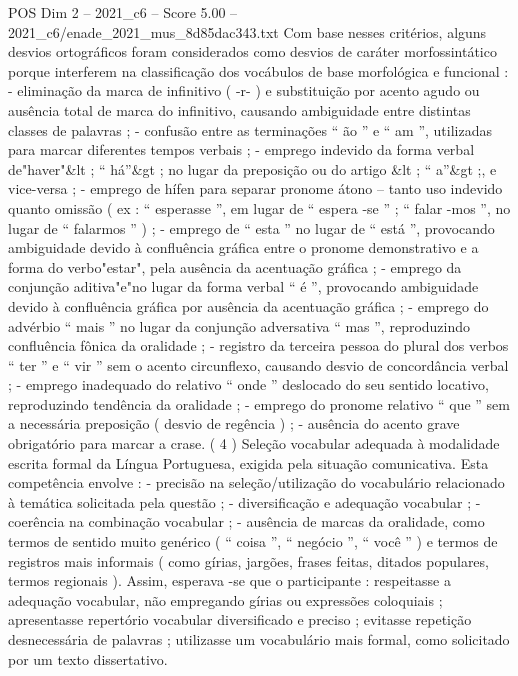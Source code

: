 \begin{textsample}{POS Dim 2 – 2021\_c6 – Score 5.00 – 2021\_c6/enade\_2021\_mus\_8d85dac343.txt}
Com base nesses critérios, alguns desvios ortográficos foram considerados como desvios de caráter morfossintático porque interferem na classificação dos vocábulos de base morfológica e funcional : - eliminação da marca de infinitivo ( -r- ) e substituição por acento agudo ou ausência total de marca do infinitivo, causando ambiguidade entre distintas classes de palavras ; - confusão entre as terminações “ ão ” e “ am ”, utilizadas para marcar diferentes tempos verbais ; - emprego indevido da forma verbal de"haver"\&lt ; “ há”\&gt ; no lugar da preposição ou do artigo \&lt ; “ a”\&gt ;, e vice-versa ; - emprego de hífen para separar pronome átono – tanto uso indevido quanto omissão ( ex : “ esperasse ”, em lugar de “ espera -se ” ; “ falar -mos ”, no lugar de “ falarmos ” ) ; - emprego de “ esta ” no lugar de “ está ”, provocando ambiguidade devido à confluência gráfica entre o pronome demonstrativo e a forma do verbo"estar", pela ausência da acentuação gráfica ; - emprego da conjunção aditiva"e"no lugar da forma verbal “ é ”, provocando ambiguidade devido à confluência gráfica por ausência da acentuação gráfica ; - emprego do advérbio “ mais ” no lugar da conjunção adversativa “ mas ”, reproduzindo confluência fônica da oralidade ; - registro da terceira pessoa do plural dos verbos “ ter ” e “ vir ” sem o acento circunflexo, causando desvio de concordância verbal ; - emprego inadequado do relativo “ onde ” deslocado do seu sentido locativo, reproduzindo tendência da oralidade ; - emprego do pronome relativo “ que ” sem a necessária preposição ( desvio de regência ) ; - ausência do acento grave obrigatório para marcar a crase. ( 4 ) Seleção vocabular adequada à modalidade escrita formal da Língua Portuguesa, exigida pela situação comunicativa.
Esta competência envolve : - precisão na seleção/utilização do vocabulário relacionado à temática solicitada pela questão ; - diversificação e adequação vocabular ; - coerência na combinação vocabular ; - ausência de marcas da oralidade, como termos de sentido muito genérico ( “ coisa ”, “ negócio ”, “ você ” ) e termos de registros mais informais ( como gírias, jargões, frases feitas, ditados populares, termos regionais ).
Assim, esperava -se que o participante : respeitasse a adequação vocabular, não empregando gírias ou expressões coloquiais ; apresentasse repertório vocabular diversificado e preciso ; evitasse repetição desnecessária de palavras ; utilizasse um vocabulário mais formal, como solicitado por um texto dissertativo.

\end{textsample}
